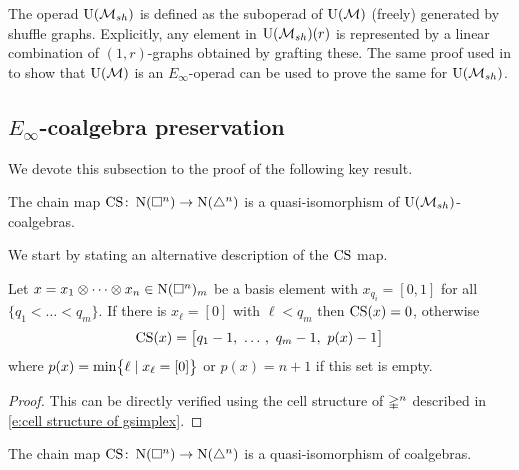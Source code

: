 The operad $\UMsh$ is defined as the suboperad of $\UM$ (freely) generated by shuffle graphs.
Explicitly, any element in $\UMsh(r)$ is represented by a linear combination of $(1,r)$-graphs obtained by grafting these.
The same proof used in \cite[p.5]{medina2020prop1} to show that $\UM$ is an $E_\infty$-operad can be used to prove the same for $\UMsh$.

\subsection{$E_\infty$-coalgebra preservation} \label{ss:e-infty preservation}

We devote this subsection to the proof of the following key result.

\begin{theorem} \label{t:main local}
	The chain map $\CS \colon \chains(\cube^n) \to \chains(\simplex^n)$ is a quasi-isomorphism of $\UMsh$-coalgebras.
\end{theorem}

We start by stating an alternative description of the $\CS$ map.

\begin{lemma} \label{l:cs explicit}
	Let $x = x_1 \ot \cdots \ot x_n \in \chains(\cube^n)_m$ be a basis element with $x_{q_i} = [0,1]$ for all $\{q_1 < \dots < q_m\}$.
	If there is $x_\ell = [0]$ with $\ell < q_m$ then $\CS(x) = 0$, otherwise
	\[
	\CS(x) = \big[ q_1-1, \ \dots \, , \ q_m-1, \ p(x)-1 \big]
	\]
	where $p(x) = \min \set[\big]{\ell \mid x_\ell = [0]}$ or $p(x) = n+1$ if this set is empty.
\end{lemma}

\begin{proof}
	This can be directly verified using the cell structure of $\gsimplex^n$ described in \cref{e:cell structure of gsimplex}.
\end{proof}

\begin{lemma} \label{l:cs coalgebra map}
	The chain map $\CS \colon \chains(\cube^n) \to \chains(\simplex^n)$ is a quasi-isomorphism of coalgebras.
\end{lemma}

